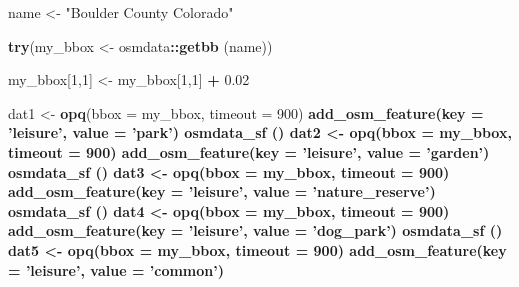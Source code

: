 \documentclass[
]{article}
\newenvironment{Shaded}{\begin{snugshade}}{\end{snugshade}}
\newcommand{\DataTypeTok}[1]{\textcolor[rgb]{0.13,0.29,0.53}{#1}}
\newcommand{\DecValTok}[1]{\textcolor[rgb]{0.00,0.00,0.81}{#1}}
\newcommand{\FloatTok}[1]{\textcolor[rgb]{0.00,0.00,0.81}{#1}}
\newcommand{\KeywordTok}[1]{\textcolor[rgb]{0.13,0.29,0.53}{\textbf{#1}}}
\newcommand{\NormalTok}[1]{#1}
\newcommand{\OperatorTok}[1]{\textcolor[rgb]{0.81,0.36,0.00}{\textbf{#1}}}
\newcommand{\StringTok}[1]{\textcolor[rgb]{0.31,0.60,0.02}{#1}}
\begin{document}
\begin{Shaded}
\begin{Highlighting}[]
\NormalTok{name <-}\StringTok{ "Boulder County Colorado"}

\KeywordTok{try}\NormalTok{(my_bbox <-}\StringTok{ }\NormalTok{osmdata}\OperatorTok{::}\KeywordTok{getbb}\NormalTok{ (name))}

\NormalTok{my_bbox[}\DecValTok{1}\NormalTok{,}\DecValTok{1}\NormalTok{] <-}\StringTok{ }\NormalTok{my_bbox[}\DecValTok{1}\NormalTok{,}\DecValTok{1}\NormalTok{] }\OperatorTok{+}\StringTok{ }\FloatTok{0.02}


\NormalTok{dat1 <-}\StringTok{ }\KeywordTok{opq}\NormalTok{(}\DataTypeTok{bbox =}\NormalTok{ my_bbox, }\DataTypeTok{timeout =} \DecValTok{900}\NormalTok{) }\OperatorTok{%
\StringTok{    }\KeywordTok{add_osm_feature}\NormalTok{(}\DataTypeTok{key =} \StringTok{'leisure'}\NormalTok{, }\DataTypeTok{value =} \StringTok{'park'}\NormalTok{) }\OperatorTok{%
\StringTok{    }\KeywordTok{osmdata_sf}\NormalTok{ ()}
\NormalTok{dat2 <-}\StringTok{ }\KeywordTok{opq}\NormalTok{(}\DataTypeTok{bbox =}\NormalTok{ my_bbox, }\DataTypeTok{timeout =} \DecValTok{900}\NormalTok{) }\OperatorTok{%
\StringTok{    }\KeywordTok{add_osm_feature}\NormalTok{(}\DataTypeTok{key =} \StringTok{'leisure'}\NormalTok{, }\DataTypeTok{value =} \StringTok{'garden'}\NormalTok{) }\OperatorTok{%
\StringTok{    }\KeywordTok{osmdata_sf}\NormalTok{ ()}
\NormalTok{dat3 <-}\StringTok{ }\KeywordTok{opq}\NormalTok{(}\DataTypeTok{bbox =}\NormalTok{ my_bbox, }\DataTypeTok{timeout =} \DecValTok{900}\NormalTok{) }\OperatorTok{%
\StringTok{    }\KeywordTok{add_osm_feature}\NormalTok{(}\DataTypeTok{key =} \StringTok{'leisure'}\NormalTok{, }\DataTypeTok{value =} \StringTok{'nature_reserve'}\NormalTok{) }\OperatorTok{%
\StringTok{    }\KeywordTok{osmdata_sf}\NormalTok{ ()}
\NormalTok{dat4 <-}\StringTok{ }\KeywordTok{opq}\NormalTok{(}\DataTypeTok{bbox =}\NormalTok{ my_bbox, }\DataTypeTok{timeout =} \DecValTok{900}\NormalTok{) }\OperatorTok{%
\StringTok{    }\KeywordTok{add_osm_feature}\NormalTok{(}\DataTypeTok{key =} \StringTok{'leisure'}\NormalTok{, }\DataTypeTok{value =} \StringTok{'dog_park'}\NormalTok{) }\OperatorTok{%
\StringTok{    }\KeywordTok{osmdata_sf}\NormalTok{ ()}
\NormalTok{dat5 <-}\StringTok{ }\KeywordTok{opq}\NormalTok{(}\DataTypeTok{bbox =}\NormalTok{ my_bbox, }\DataTypeTok{timeout =} \DecValTok{900}\NormalTok{) }\OperatorTok{%
\StringTok{    }\KeywordTok{add_osm_feature}\NormalTok{(}\DataTypeTok{key =} \StringTok{'leisure'}\NormalTok{, }\DataTypeTok{value =} \StringTok{'common'}\NormalTok{) }\OperatorTok{%
}}}}}}}}}}
\end{Highlighting}
\end{Shaded}
\end{document}
